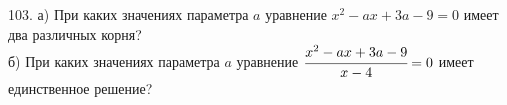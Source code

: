 103. а) При каких значениях параметра $a$ уравнение $x^2-ax+3a-9=0$ имеет два различных корня?\\
б) При каких значениях параметра $a$ уравнение $\cfrac{x^2-ax+3a-9}{x-4}=0$ имеет единственное решение?\\
